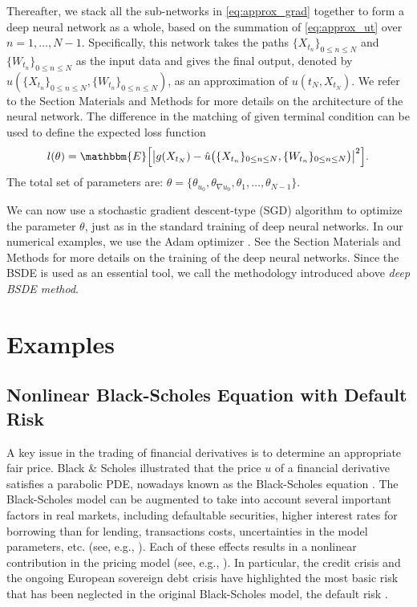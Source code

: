 \documentclass[11pt,english]{article}
\providecommand{\E}{{\ensuremath{\mathbbm{E}}}}
\begin{document}
Thereafter, we stack all the sub-networks in \eqref{eq:approx_grad} together to form a deep neural 
network as a whole, based on the summation of \eqref{eq:approx_ut} over $n = 1, \dots, N-1$. 
Specifically, this network takes the paths 
$\{ X_{ t_n } \}_{ 0 \leq n \leq N }$ and 
$\{ W_{ t_n } \}_{ 0 \leq n \leq N }$ 
as the input data and gives the final output, 
denoted by 
$
  \hat{u}( 
    \{ { X_{ t_n } } \}_{ 0 \leq n \leq N } , 
    \{ W_{ t_n } \}_{ 0 \leq n \leq N } 
  ) 
$, 
as an approximation of 
$u( t_N, X_{ t_N } )$. 
We refer to the Section Materials and Methods for more details on the architecture of the neural network.
The difference in the matching of given terminal condition can be used to define the expected loss function 
\begin{equation}
  l(\theta) = 
  \E\Big[
    \big|
      g( X_{ t_N } ) -
      \hat{u}\big(
        \{ X_{ t_n } \}_{ 0 \leq n \leq N } ,
        \{ W_{ t_n } \}_{ 0 \leq n \leq N }
      \big)
    \big|^2
  \Big].
\end{equation}
The total set of parameters are:
$\theta=\{\theta_{u_0},\theta_{\nabla u_0},\theta_1,\dots,\theta_{N-1}\}$.

We can now use a stochastic gradient descent-type (SGD) algorithm to optimize the parameter $\theta$, just as in the standard training of deep neural networks.
In our numerical examples, we use the Adam optimizer \cite{Kingma2015}. 
See the Section Materials and Methods for more details on the training of the deep neural networks.
Since the BSDE is used as an essential tool, we call the
methodology introduced above \emph{deep BSDE method}.


\section*{\label{sec3}Examples}
\subsection*{Nonlinear Black-Scholes Equation with Default Risk}
A key issue in the trading of financial derivatives is to determine an appropriate fair price.
Black \& Scholes illustrated 
that the price $ u$ of a financial derivative satisfies a parabolic 
PDE, nowadays known as the Black-Scholes equation \cite{Black2012}.
The Black-Scholes model can be augmented to take into account several important
factors in real markets, including defaultable securities, 
higher interest rates for borrowing than for lending, 
transactions costs, uncertainties in the model parameters, etc. (see, e.g., \cite{Duffie1996,Bender2017,Bergman1995,Leland1985,Avellaneda1995}). 
Each of these effects results in a nonlinear contribution in the pricing model
(see, e.g., \cite{Bender2017,Crepey2013,Forsyth2001}). 
In particular, the credit crisis and the ongoing European sovereign debt crisis 
have highlighted the most basic risk that has been neglected in the original Black-Scholes model, 
the default risk \cite{Crepey2013}.
\end{document}
